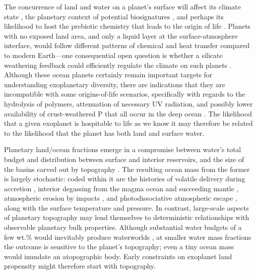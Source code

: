 The concurrence of land and water on a planet's surface will affect its climate state \citep{turbet_habitability_2016, rushby_effect_2019, delgenio_albedos_2019, graham_thermodynamic_2020, zhao_climate_2021}, the planetary context of potential biosignatures \citep{schwieterman_exoplanet_2018, glaser_detectability_2020, lisse_geologically_2020, krissansen-totton_oxygen_2021}, and perhaps its likelihood to host the prebiotic chemistry that leads to the origin of life \citep{patel_common_2015, rimmer_origin_2018, rosas_archaean_2021, vankranendonk_elements_2021}. Planets with no exposed land area, and only a liquid layer at the surface-atmosphere interface, would follow different patterns of chemical and heat transfer compared to modern Earth---one consequential open question is whether a silicate weathering feedback could efficiently regulate the climate on such planets \citep[e.g.,][]{honing_carbon_2019, gernon_global_2021}. Although these ocean planets certainly remain important targets for understanding exoplanetary diversity, there are indications that they are incompatible with some origins-of-life scenarios, specifically with regards to the hydrolysis of polymers, attenuation of necessary UV radiation, and possibly lower availability of crust-weathered P that all occur in the deep ocean \citep[e.g.,][]{sutherland_opinion_2017, walton_phosphorus_2023}. The likelihood that a given exoplanet is hospitable to life as we know it may therefore be related to the likelihood that the planet has both land and surface water.


Planetary land/ocean fractions emerge in a compromise between water's total budget and distribution between surface and interior reservoirs, and the size of the basins carved out by topography \citep[e.g.,][]{simpson_bayesian_2017}. The resulting ocean mass from the former is largely stochastic: coded within it are the histories of volatile delivery during accretion \citep{raymond_highresolution_2006, morbidelli_building_2012}, interior degassing from the magma ocean and succeeding mantle \citep{elkins-tanton_linked_2008, schaefer_redox_2017,  katyal_effect_2020, ortenzi_mantle_2020, guimond_low_2021, barth_magma_2021, lichtenberg_vertically_2021, bower_retention_2021}, atmospheric erosion by impacts \citep{zahnle_cosmic_2017, schlichting_atmosphere_2018, howe_survival_2020}, and photodissociative atmospheric escape \citep{tian_water_2015, zahnle_strange_2019, gronoff_atmospheric_2020}, along with the surface temperature and pressure. In contrast, large-scale aspects of planetary topography may lend themselves to deterministic relationships with observable planetary bulk properties. Although substantial water budgets of a few wt.\% would inevitably produce waterworlds \citep[e.g.,][]{simpson_bayesian_2017}, at smaller water mass fractions the outcome is sensitive to the planet's topography; even a tiny ocean mass would inundate an atopographic body. Early constraints on exoplanet land propensity might therefore start with topography.

